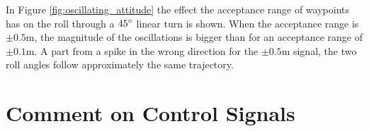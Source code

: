 In Figure \ref{fig:oscillating_attitude} the effect the acceptance range of waypoints has on the roll through a $45\degree$ linear turn is shown. When the acceptance range is $\pm 0.5$m, the magnitude of the oscillations is bigger than for an acceptance range of $\pm 0.1$m. A part from a spike in the wrong direction for the $\pm 0.5$m signal, the two roll angles follow approximately the same trajectory.



\section{Comment on Control Signals}